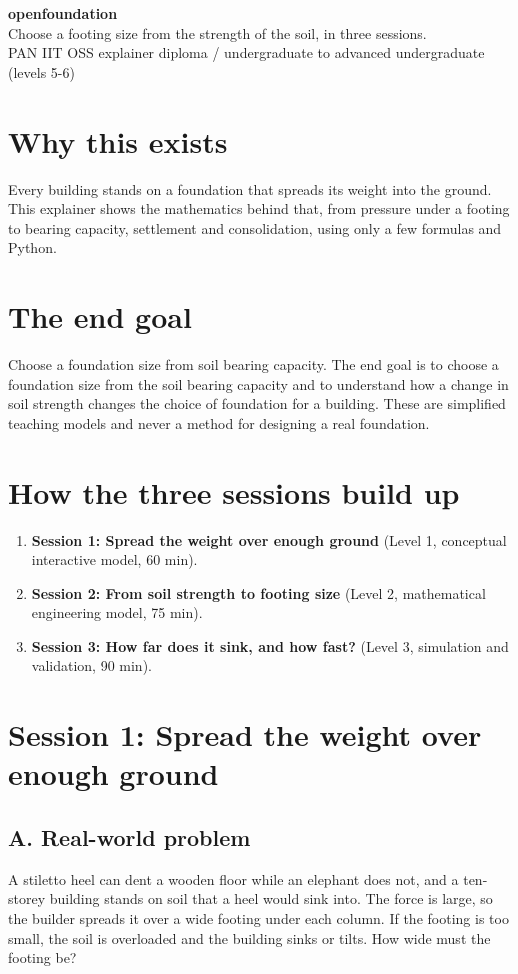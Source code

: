 \documentclass[11pt,a4paper]{article}
\begin{document}
\begin{center}{\LARGE\bfseries openfoundation}\\[0.4em]{\large Choose a footing size from the strength of the soil, in three sessions.}\\[0.2em]\small PAN IIT OSS explainer \textbullet{} diploma / undergraduate to advanced undergraduate (levels 5-6)\end{center}

\section*{Why this exists}
Every building stands on a foundation that spreads its weight into the ground. This explainer shows the mathematics behind that, from pressure under a footing to bearing capacity, settlement and consolidation, using only a few formulas and Python.

\section*{The end goal}
Choose a foundation size from soil bearing capacity. The end goal is to choose a foundation size from the soil bearing capacity and to understand how a change in soil strength changes the choice of foundation for a building. These are simplified teaching models and never a method for designing a real foundation.

\section*{How the three sessions build up}
\begin{enumerate}[nosep]
\item \textbf{Session 1: Spread the weight over enough ground} (Level 1, conceptual interactive model, 60 min).
\item \textbf{Session 2: From soil strength to footing size} (Level 2, mathematical engineering model, 75 min).
\item \textbf{Session 3: How far does it sink, and how fast?} (Level 3, simulation and validation, 90 min).
\end{enumerate}

\section{Session 1: Spread the weight over enough ground}

\subsection*{A. Real-world problem}
A stiletto heel can dent a wooden floor while an elephant does not, and a ten-storey building stands on soil that a heel would sink into. The force is large, so the builder spreads it over a wide footing under each column. If the footing is too small, the soil is overloaded and the building sinks or tilts. How wide must the footing be?
\end{document}
